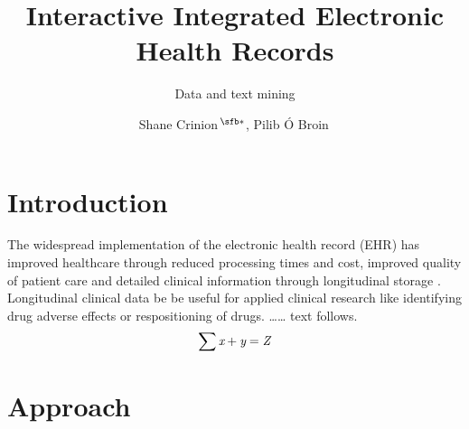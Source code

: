 \documentclass{bioinfo}
\begin{document}

\subtitle{Data and text mining}

\title[short Title]{Interactive Integrated Electronic Health Records}
\author[Sample \textit{et~al}.]{Shane Crinion\,$^{\text{\sfb}*}$, Pilib \'{O} Broin\,}
\address{$^{\text{\sf 1}}$School of Mathematics, Statistics \& Applied Mathematics, National University of Ireland, Galway, H91 H3CY\\}





\maketitle

\section{Introduction}

The widespread implementation of the electronic health record (EHR) has improved healthcare through reduced processing times and cost, improved quality of patient care and detailed clinical information through longitudinal storage \citealp{PheWAS}. Longitudinal clinical data be be useful for applied clinical research like identifying drug adverse effects or respositioning of drugs.
{\ldots}{\ldots} text follows.
\begin{equation}
\sum \text{\it x}+ \text{\it y} =\text{\it Z}\label{eq:01}\vspace*{-10pt}
\end{equation}


\section{Approach}
\end{document}
